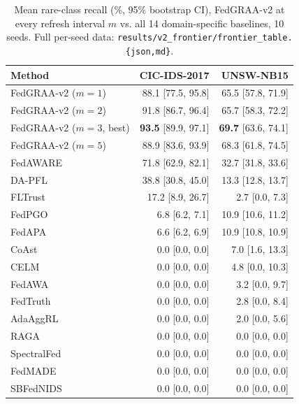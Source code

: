 \documentclass{llncs}
\begin{document}
\begin{table}[htbp]
\centering
\caption{Mean rare-class recall (\%, 95\% bootstrap CI), FedGRAA-v2 at every refresh interval $m$ vs. all 14 domain-specific baselines, 10 seeds. Full per-seed data: \texttt{results/v2\_frontier/frontier\_table.\{json,md\}}.}
\label{tab:frontier}
\small
\begin{tabular}{lrr}
\toprule
\textbf{Method} & \textbf{CIC-IDS-2017} & \textbf{UNSW-NB15} \\
\midrule
FedGRAA-v2 ($m=1$)          & 88.1 [77.5, 95.8]   & 65.5 [57.8, 71.9] \\
FedGRAA-v2 ($m=2$)          & 91.8 [86.7, 96.4]   & 65.7 [58.3, 72.2] \\
FedGRAA-v2 ($m=3$, best)    & \textbf{93.5} [89.9, 97.1] & \textbf{69.7} [63.6, 74.1] \\
FedGRAA-v2 ($m=5$)          & 88.9 [83.6, 93.9]   & 68.3 [61.8, 74.5] \\
\midrule
FedAWARE~\cite{FedAWARE}    & 71.8 [62.9, 82.1]   & 32.7 [31.8, 33.6] \\
DA-PFL~\cite{DAPFL}         & 38.8 [30.8, 45.0]   & 13.3 [12.8, 13.7] \\
FLTrust~\cite{FLTrust}      & 17.2 [8.9, 26.7]    & 2.7 [0.0, 7.3] \\
FedPGO~\cite{FedPGO}        & 6.8 [6.2, 7.1]      & 10.9 [10.6, 11.2] \\
FedAPA~\cite{FedAPA}        & 6.6 [6.2, 6.9]      & 10.9 [10.8, 10.9] \\
CoAst~\cite{CoAst}          & 0.0 [0.0, 0.0]      & 7.0 [1.6, 13.3] \\
CELM~\cite{CELM}             & 0.0 [0.0, 0.0]      & 4.8 [0.0, 10.3] \\
FedAWA~\cite{FedAWA}        & 0.0 [0.0, 0.0]      & 3.2 [0.0, 9.7] \\
FedTruth~\cite{FedTruth}    & 0.0 [0.0, 0.0]      & 2.8 [0.0, 8.4] \\
AdaAggRL~\cite{AdaAggRL}    & 0.0 [0.0, 0.0]      & 2.0 [0.0, 5.6] \\
RAGA~\cite{RAGA}            & 0.0 [0.0, 0.0]      & 0.0 [0.0, 0.0] \\
SpectralFed~\cite{SpectralFed} & 0.0 [0.0, 0.0]   & 0.0 [0.0, 0.0] \\
FedMADE~\cite{FedMADE}      & 0.0 [0.0, 0.0]      & 0.0 [0.0, 0.0] \\
SBFedNIDS~\cite{SBFedNIDS}  & 0.0 [0.0, 0.0]      & 0.0 [0.0, 0.0] \\
\bottomrule
\end{tabular}
\end{table}
\end{document}
